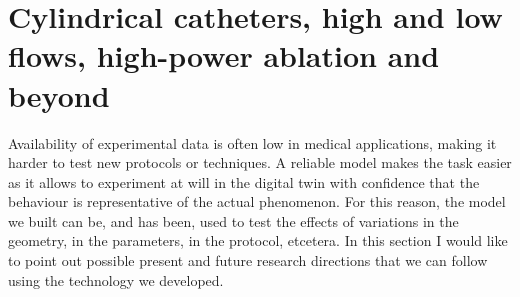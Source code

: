 \section[Future developments]{Cylindrical catheters, high and low flows, high-power ablation and beyond}
\label{sec_future}
Availability of experimental data is often low in medical applications, making it harder to test new protocols or techniques.
A reliable model makes the task easier as it allows to experiment at will in the digital twin with confidence that the behaviour is representative of the actual phenomenon.
For this reason, the model we built can be, and has been, used to test the effects of variations in the geometry, in the parameters, in the protocol, etcetera.
In this section I would like to point out possible present and future research directions that we can follow using the technology we developed.

